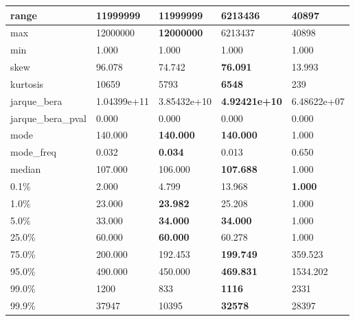 \begin{table}[H]
\begin{tabular}{|l|m{10em}|m{10em}|m{10em}|m{10em}|}
\hline range & 11999999 & \bfseries 11999999 & 6213436 & \cellcolor[rgb]{0.9, 0.54, 0.52} 40897 \\
\hline max & 12000000 & \bfseries 12000000 & 6213437 & \cellcolor[rgb]{0.9, 0.54, 0.52} 40898 \\
\hline min & 1.000 & 1.000 & 1.000 & 1.000 \\
\hline skew & 96.078 & 74.742 & \bfseries 76.091 & \cellcolor[rgb]{0.9, 0.54, 0.52} 13.993 \\
\hline kurtosis & 10659 & 5793 & \bfseries 6548 & \cellcolor[rgb]{0.9, 0.54, 0.52} 239 \\
\hline jarque\_bera & 1.04399e+11 & 3.85432e+10 & \bfseries 4.92421e+10 & \cellcolor[rgb]{0.9, 0.54, 0.52} 6.48622e+07 \\
\hline jarque\_bera\_pval & 0.000 & 0.000 & 0.000 & 0.000 \\
\hline mode & 140.000 & \bfseries 140.000 & \bfseries 140.000 & \cellcolor[rgb]{0.9, 0.54, 0.52} 1.000 \\
\hline mode\_freq & 0.032 & \bfseries 0.034 & 0.013 & \cellcolor[rgb]{0.9, 0.54, 0.52} 0.650 \\
\hline median & 107.000 & 106.000 & \bfseries 107.688 & \cellcolor[rgb]{0.9, 0.54, 0.52} 1.000 \\
\hline 0.1\% & 2.000 & 4.799 & \cellcolor[rgb]{0.9, 0.54, 0.52} 13.968 & \bfseries 1.000 \\
\hline 1.0\% & 23.000 & \bfseries 23.982 & 25.208 & \cellcolor[rgb]{0.9, 0.54, 0.52} 1.000 \\
\hline 5.0\% & 33.000 & \bfseries 34.000 & \bfseries 34.000 & \cellcolor[rgb]{0.9, 0.54, 0.52} 1.000 \\
\hline 25.0\% & 60.000 & \bfseries 60.000 & 60.278 & \cellcolor[rgb]{0.9, 0.54, 0.52} 1.000 \\
\hline 75.0\% & 200.000 & 192.453 & \bfseries 199.749 & \cellcolor[rgb]{0.9, 0.54, 0.52} 359.523 \\
\hline 95.0\% & 490.000 & 450.000 & \bfseries 469.831 & \cellcolor[rgb]{0.9, 0.54, 0.52} 1534.202 \\
\hline 99.0\% & 1200 & 833 & \bfseries 1116 & \cellcolor[rgb]{0.9, 0.54, 0.52} 2331 \\
\hline 99.9\% & 37947 & \cellcolor[rgb]{0.9, 0.54, 0.52} 10395 & \bfseries 32578 & 28397 \\
\hline
\end{tabular}
\end{table}
